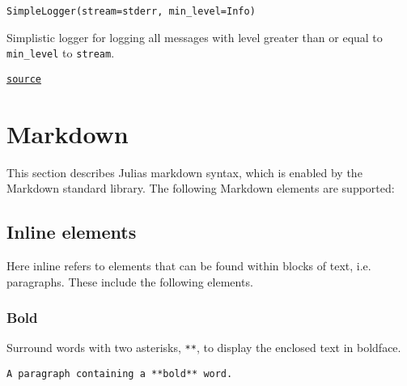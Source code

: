 \begin{adjustwidth}{2em}{0pt}


\begin{verbatim}
SimpleLogger(stream=stderr, min_level=Info)
\end{verbatim}

Simplistic logger for logging all messages with level greater than or equal to \texttt{min\_level} to \texttt{stream}.



\href{https://github.com/JuliaLang/julia/blob/44fa15b1502a45eac76c9017af94332d4557b251/base/logging.jl#L518-L523}{\texttt{source}}


\end{adjustwidth}

\hypertarget{6677165778934209668}{}


\chapter{Markdown}



This section describes Julia{\textquotesingle}s markdown syntax, which is enabled by the Markdown standard library. The following Markdown elements are supported:



\hypertarget{8063626144587397226}{}


\section{Inline elements}



Here {\textquotedbl}inline{\textquotedbl} refers to elements that can be found within blocks of text, i.e. paragraphs. These include the following elements.



\hypertarget{10166533682417016306}{}


\subsection{Bold}



Surround words with two asterisks, \texttt{**}, to display the enclosed text in boldface.




\begin{lstlisting}
A paragraph containing a **bold** word.
\end{lstlisting}



